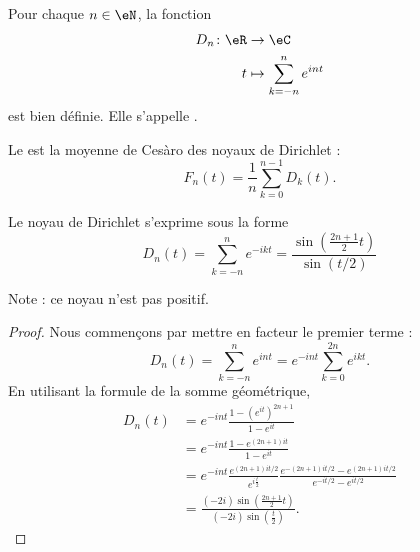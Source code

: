 \begin{propositionDef}      \label{PROPooUOKAooGzGZWc}
    Pour chaque \( n\in \eN\), la fonction
    \begin{equation}
        \begin{aligned}
            D_n\colon \eR&\to \eC \\
            t&\mapsto \sum_{k=-n}^n  e^{int}
        \end{aligned}
    \end{equation}
    est bien définie. Elle s'appelle .
\end{propositionDef}

Le  est la moyenne de Cesàro des noyaux de Dirichlet :
\begin{equation}
    F_n(t)=\frac{1}{ n }\sum_{k=0}^{n-1}D_k(t).
\end{equation}

\begin{lemma}   \label{LemHPoIkwu}
    Le noyau de Dirichlet s'exprime sous la forme
    \begin{equation}
        D_n(t)=\sum_{k=-n}^n e^{-ikt}=\frac{ \sin\left( \frac{ 2n+1 }{ 2 }t \right) }{ \sin(t/2) }
    \end{equation}
\end{lemma}
Note : ce noyau n'est pas positif.

\begin{proof}
    Nous commençons par mettre en facteur le premier terme :
    \begin{equation}
        D_n(t)=\sum_{k=-n}^n e^{int}= e^{-int}\sum_{k=0}^{2n} e^{ikt}.
    \end{equation}
    En utilisant la formule de la somme géométrique,
    \begin{subequations}
        \begin{align}
            D_n(t)&= e^{-int}\frac{ 1-( e^{it})^{2n+1} }{ 1- e^{it} }\\
            &= e^{-int}\frac{ 1- e^{(2n+1)it} }{ 1- e^{it} }\\
            &= e^{-int}\frac{  e^{(2n+1)it/2} }{  e^{i\frac{ t }{ 2 }} }\frac{  e^{-(2n+1)it/2}- e^{(2n+1)it/2} }{  e^{-it/2}- e^{it/2} }\\
            &=\frac{ (-2i)\sin\left( \frac{ 2n+1 }{ 2 }t \right) }{ (-2i)\sin\left( \frac{ t }{2} \right) }.
        \end{align}
    \end{subequations}
\end{proof}

